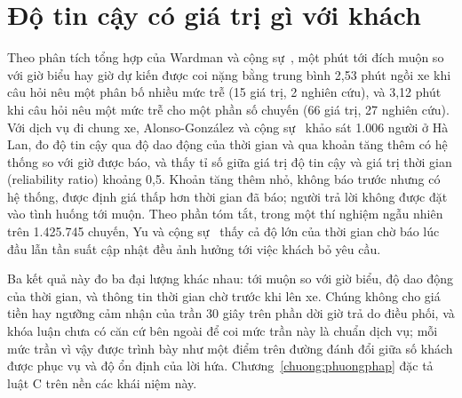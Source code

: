 \section{Độ tin cậy có giá trị gì với khách}
\label{muc:c2-giatri}

Theo phân tích tổng hợp của Wardman và cộng sự~\cite{wardman2026}, một phút tới đích muộn so với giờ biểu hay giờ dự
kiến được coi nặng bằng trung bình 2,53 phút ngồi xe khi câu hỏi nêu một phân bố nhiều mức trễ (15 giá trị, 2
nghiên cứu), và 3,12 phút khi câu hỏi nêu một mức trễ cho một phần số chuyến (66 giá trị, 27 nghiên cứu). Với
dịch vụ đi chung xe, Alonso-González và cộng sự~\cite{alonsogonzalez2020} khảo sát 1.006 người ở Hà Lan, đo độ tin cậy
qua độ dao động của thời gian và qua khoản tăng thêm có hệ thống so với giờ được báo, và thấy tỉ số giữa giá trị độ
tin cậy và giá trị thời gian (reliability ratio) khoảng 0,5. Khoản tăng thêm nhỏ, không báo trước nhưng có hệ thống,
được định giá thấp hơn thời gian đã báo; người trả lời không được đặt vào tình huống tới muộn. Theo phần tóm tắt, trong
một thí nghiệm ngẫu nhiên trên 1.425.745 chuyến, Yu và cộng sự~\cite{yu2022} thấy cả độ lớn của thời gian chờ báo lúc
đầu lẫn tần suất cập nhật đều ảnh hưởng tới việc khách bỏ yêu cầu.

Ba kết quả này đo ba đại lượng khác nhau: tới muộn so với giờ biểu, độ dao động của thời gian, và thông tin thời gian
chờ trước khi lên xe. Chúng không cho giá tiền hay ngưỡng cảm nhận của trần 30 giây trên phần dời giờ trả do điều
phối, và khóa luận chưa có căn cứ bên ngoài để coi mức trần này là chuẩn dịch vụ; mỗi mức trần vì vậy được trình bày
như một điểm trên đường đánh đổi giữa số khách được phục vụ và độ ổn định của lời hứa.
Chương~\ref{chuong:phuongphap} đặc tả luật C trên nền các khái niệm này.
